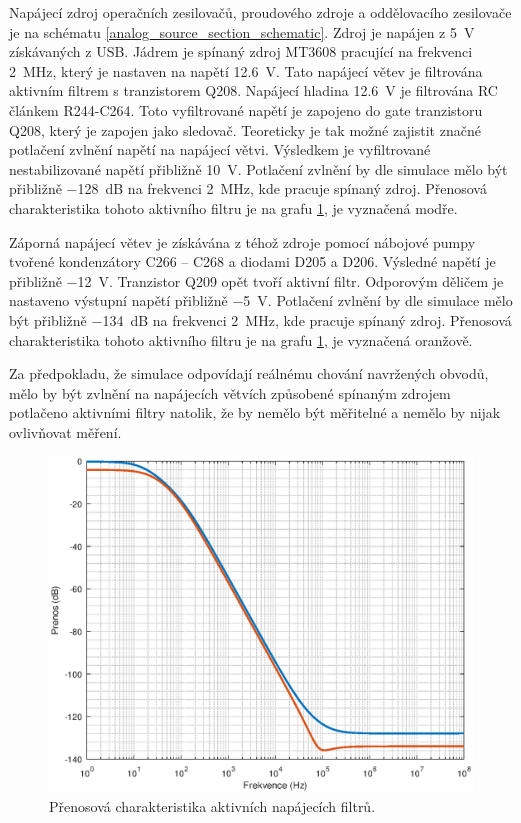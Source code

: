Napájecí zdroj operačních zesilovačů, proudového zdroje a oddělovacího zesilovače je na schématu \ref{analog_source_section_schematic}. Zdroj je napájen z \SI{5}{\volt} získávaných z USB. Jádrem je spínaný zdroj MT3608 pracující na frekvenci \SI{2}{\mega\hertz}, který je nastaven na napětí \SI{12.6}{\volt}. Tato napájecí větev je filtrována aktivním filtrem s tranzistorem Q208. Napájecí hladina \SI{12.6}{\volt} je filtrována RC článkem R244-C264. Toto vyfiltrované napětí je zapojeno do gate tranzistoru Q208, který je zapojen jako sledovač. Teoreticky je tak možné zajistit značné potlačení zvlnění napětí na napájecí větvi. Výsledkem je vyfiltrované nestabilizované napětí přibližně \SI{10}{\volt}. Potlačení zvlnění by dle simulace mělo být přibližně \SI{-128}{\deci\bel} na frekvenci \SI{2}{\mega\hertz}, kde pracuje spínaný zdroj. Přenosová charakteristika tohoto aktivního filtru je na grafu \ref{analog_source_filter_transfer}, je vyznačená modře.

Záporná napájecí větev je získávána z téhož zdroje pomocí nábojové pumpy tvořené kondenzátory C266 -- C268 a diodami D205 a D206. Výsledné napětí je přibližně \SI{-12}{\volt}. Tranzistor Q209 opět tvoří aktivní filtr. Odporovým děličem je nastaveno výstupní napětí přibližně \SI{-5}{\volt}. Potlačení zvlnění by dle simulace mělo být přibližně \SI{-134}{\deci\bel} na frekvenci \SI{2}{\mega\hertz}, kde pracuje spínaný zdroj. Přenosová charakteristika tohoto aktivního filtru je na grafu \ref{analog_source_filter_transfer}, je vyznačená oranžově.

Za předpokladu, že simulace odpovídají reálnému chování navržených obvodů, mělo by být zvlnění na napájecích větvích způsobené spínaným zdrojem potlačeno aktivními filtry natolik, že by nemělo být měřitelné a nemělo by nijak ovlivňovat měření.

\begin{figure}[htbp]
\includegraphics[width=\textwidth,keepaspectratio]{images/denoiser_transfer_function.eps}\caption{Přenosová charakteristika aktivních napájecích filtrů.}\label{analog_source_filter_transfer}
\end{figure}

